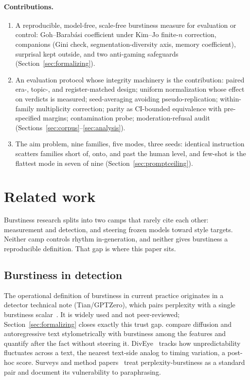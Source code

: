 \documentclass{article}
\begin{document}
\paragraph{Contributions.}
\begin{enumerate}
\item A reproducible, model-free, scale-free burstiness measure for
evaluation or control: Goh--Barab\'asi coefficient
under Kim--Jo finite-$n$ correction, companions
(Gini check, segmentation-diversity axis, memory coefficient), surprisal
kept outside, and two anti-gaming safeguards
(Section~\ref{sec:formalizing}).
\item An evaluation protocol whose integrity machinery is the
contribution: paired era-, topic-, and register-matched design;
uniform normalization whose effect on verdicts is measured;
seed-averaging avoiding pseudo-replication; within-family multiplicity
correction; parity as CI-bounded equivalence with pre-specified margins;
contamination probe; moderation-refusal audit
(Sections~\ref{sec:corpus}--\ref{sec:analysis}).
\item The aim problem, nine families, five modes, three seeds:
identical instruction scatters families short of, onto, and past the
human level, and few-shot is the flattest mode in seven of nine
(Section~\ref{sec:promptceiling}).
\end{enumerate}

\section{Related work}\label{sec:related}

Burstiness research splits into two camps that rarely cite each other: measurement and detection, and steering frozen models toward style targets. Neither camp controls rhythm in-generation, and neither gives burstiness a reproducible definition. That gap is where this paper sits.

\subsection{Burstiness in detection}
The operational definition of burstiness in current practice originates in a detector technical note (Tian/GPTZero), which pairs perplexity with a single burstiness scalar~\citep{arxiv2024detecting, arxiv2025training}. It is widely used and not peer-reviewed; Section~\ref{sec:formalizing} closes exactly this trust gap. \citet{onan2025you} compare diffusion and autoregressive text stylometrically with burstiness among the features and quantify after the fact without steering it. DivEye~\citep{arxiv2025diveye} tracks how unpredictability fluctuates across a text, the nearest text-side analog to timing variation, a post-hoc score. Surveys and method papers~\citep{arxiv2025detecting} treat perplexity-burstiness as a standard pair and document its vulnerability to paraphrasing.
\end{document}
